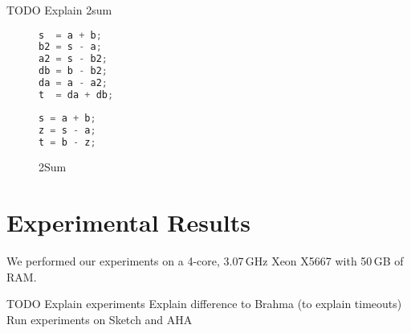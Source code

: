 \documentclass[a4paper]{llncs}
\begin{document}
TODO
Explain 2sum

\begin{figure}
 \begin{lstlisting}[language=c]
s  = a + b;
b2 = s - a;
a2 = s - b2;
db = b - b2;
da = a - a2;
t  = da + db;
 \end{lstlisting}

\begin{lstlisting}[language=c]
s = a + b;
z = s - a;
t = b - z;
\end{lstlisting}

 
 \caption{2Sum}
  \label{fig:2sum}

\end{figure}


\section{Experimental Results}
\label{sec:experiments}

We performed our experiments on a 4-core, 3.07\,GHz Xeon X5667 with 50\,GB of RAM.

TODO
Explain experiments
Explain difference to Brahma (to explain timeouts)
Run experiments on Sketch and AHA
\end{document}
